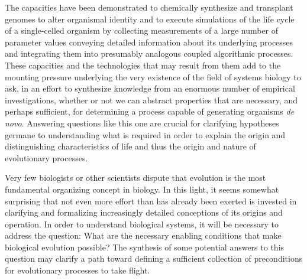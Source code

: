 The capacities have been demonstrated to chemically synthesize and transplant genomes to alter organismal identity  and to execute simulations of the life cycle of a single-celled organism  by collecting measurements of a large number of parameter values conveying detailed information about its underlying processes and integrating them into presumably analogous coupled algorithmic processes. These capacities and the technologies that may result from them add to the mounting pressure underlying the very existence of the field of systems biology to ask, in an effort to synthesize knowledge from an enormous number of empirical investigations, whether or not we can abstract properties that are necessary, and perhaps sufficient, for determining a process capable of generating organisms \emph{de novo}. Answering questions like this one are crucial for clarifying hypotheses germane to understanding what is required in order to explain the origin and distinguishing characteristics of life and thus the origin and nature of evolutionary processes.

Very few biologists or other scientists dispute that evolution is the most fundamental organizing concept in biology. In this light, it seems somewhat surprising that not even more effort than has already been exerted is invested in clarifying and formalizing increasingly detailed conceptions of its origins and operation. In order to understand biological systems, it will be necessary to address the question: What are the necessary enabling conditions that make biological evolution possible? The synthesis of some potential answers to this question may clarify a path toward defining a sufficient collection of preconditions for evolutionary processes to take flight.

